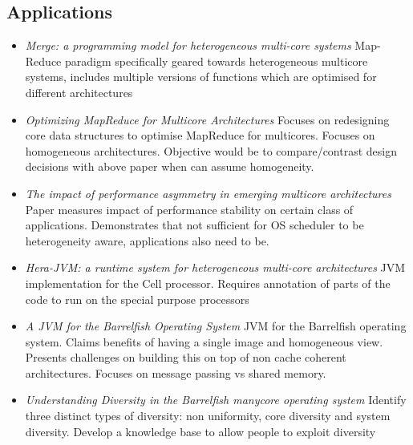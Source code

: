 \subsection{Applications}
\begin{itemize}
\item \emph{Merge: a programming model for heterogeneous multi-core systems}
Map-Reduce paradigm specifically geared towards heterogeneous multicore systems,
includes multiple versions of functions which are optimised for different architectures \cite{LCWM:08}
\item \emph{Optimizing MapReduce for Multicore Architectures} Focuses on redesigning
core data structures to optimise MapReduce for multicores. Focuses on homogeneous
architectures. Objective would be to compare/contrast design decisions with
above paper when can assume homogeneity. \cite{Mao10optimizingmapreduce}
\item \emph{The impact of performance asymmetry in emerging multicore architectures}
Paper measures impact of performance stability on certain class of applications.
Demonstrates that not sufficient for OS scheduler to be heterogeneity aware,
applications also need to be. \cite{Balakrishnan:2005:IPA:1069807.1070012} 
\item \emph{Hera-JVM: a runtime system for heterogeneous multi-core 
architectures} JVM implementation for the Cell processor. Requires annotation
of parts of the code to run on the special purpose processors \cite{McIlroy:2010:HRS:1869459.1869478}
\item \emph{A JVM for the Barrelfish Operating System} JVM for the Barrelfish
operating system. Claims benefits of having a single image and homogeneous view. 
Presents challenges on building this on top of non cache coherent architectures.
Focuses on message passing vs shared memory. \cite{maasjvm} 
\item \emph{Understanding Diversity in the Barrelfish manycore operating system}
Identify three distinct types of diversity: non uniformity, core diversity and 
system diversity. Develop a knowledge base to allow people to exploit
diversity
\end{itemize}

